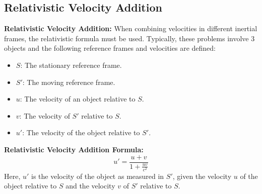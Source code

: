 \documentclass{article}
\newcommand{\eqbox}[1]{\begin{tcolorbox}[colback=gray!10] #1 \end{tcolorbox}}
\newcommand{\conceptbox}[1]{\begin{tcolorbox}[colback=blue!10] #1 \end{tcolorbox}}
\begin{document}
\subsection{Relativistic Velocity Addition}
\conceptbox{
\textbf{Relativistic Velocity Addition:}
When combining velocities in different inertial frames, the relativistic formula must be used. Typically, these problems involve 3 objects and the following reference frames and velocities are defined:
\begin{itemize}
    \item \( S \): The stationary reference frame.
    \item \( S' \): The moving reference frame.
    \item \( u \): The velocity of an object relative to \( S \).
    \item \( v \): The velocity of \( S' \) relative to \( S \).
    \item \( u' \): The velocity of the object relative to \( S' \).
\end{itemize}
\eqbox{
\textbf{Relativistic Velocity Addition Formula:}
\[
u' = \frac{u + v}{1 + \frac{uv}{c^2}}
\]
Here, \( u' \) is the velocity of the object as measured in \( S' \), given the velocity \( u \) of the object relative to \( S \) and the velocity \( v \) of \( S' \) relative to \( S \).
}
}
\end{document}
